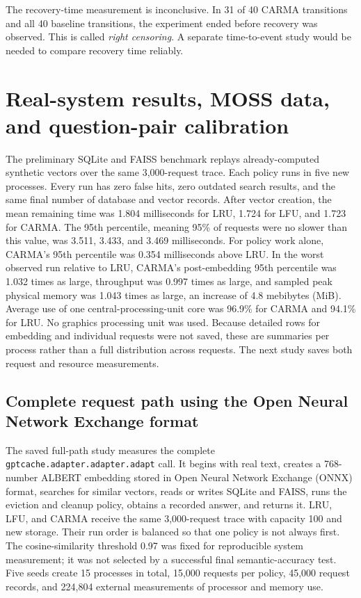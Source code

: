 \documentclass[10pt,letterpaper]{article}
\newcommand{\code}[1]{\texttt{#1}}
\begin{document}
The recovery-time measurement is inconclusive. In 31 of 40 CARMA transitions
and all 40 baseline transitions, the experiment ended before recovery was
observed. This is called \emph{right censoring}. A separate time-to-event study
would be needed to compare recovery time reliably.

\section{Real-system results, MOSS data, and question-pair calibration}

The preliminary SQLite and FAISS benchmark replays already-computed synthetic
vectors over the same 3,000-request trace. Each policy runs in five new
processes. Every run has zero false hits, zero outdated search results, and the
same final number of database and vector records. After vector creation, the
mean remaining time was 1.804 milliseconds for LRU, 1.724 for LFU, and 1.723
for CARMA. The 95th percentile, meaning 95\% of requests were no slower than
this value, was 3.511, 3.433, and 3.469 milliseconds. For policy work alone,
CARMA's 95th percentile was 0.354 milliseconds above LRU. In the worst observed
run relative to LRU, CARMA's post-embedding 95th percentile was 1.032 times as
large, throughput was 0.997 times as large, and sampled peak physical memory
was 1.043 times as large, an increase of 4.8 mebibytes (MiB). Average use of one
central-processing-unit core was 96.9\% for CARMA and 94.1\% for LRU. No
graphics processing unit was used. Because detailed rows for embedding and
individual requests were not saved, these are summaries per process rather
than a full distribution across requests. The next study saves both request
and resource measurements.

\subsection{Complete request path using the Open Neural Network Exchange format}\label{sec:gate7-v5}

The saved full-path study measures the complete
\code{gptcache.adapter.adapter.adapt} call. It begins with real text, creates a
768-number ALBERT embedding stored in Open Neural Network Exchange (ONNX)
format, searches for similar vectors, reads or writes SQLite and FAISS, runs
the eviction and cleanup policy, obtains a recorded answer, and returns it.
LRU, LFU, and CARMA receive the same 3,000-request trace with capacity 100 and
new storage. Their run order is balanced so that one policy is not always
first. The cosine-similarity threshold 0.97 was fixed for reproducible system
measurement; it was not selected by a successful final semantic-accuracy test.
Five seeds create 15 processes in total, 15,000 requests per policy, 45,000
request records, and 224,804 external measurements of processor and memory use.
\end{document}
